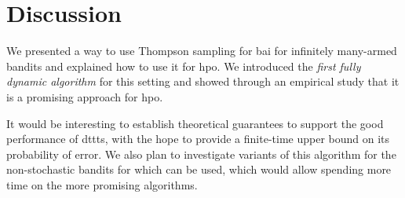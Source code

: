 \section{Discussion}\label{sec:dttts.discussion}

We presented a way to use Thompson sampling for \gls{bai} for infinitely many-armed bandits and explained how to use it for \gls{hpo}. We introduced the \textit{first fully dynamic algorithm} for this setting and showed through an empirical study that it is a promising approach for \gls{hpo}. 

It would be interesting to establish theoretical guarantees to support the good performance of \gls{dttts}, with the hope to provide a finite-time upper bound on its probability of error. We also plan to investigate variants of this algorithm for the non-stochastic bandits for which \Hyperband{} can be used, which would allow spending more time on the more promising algorithms.
